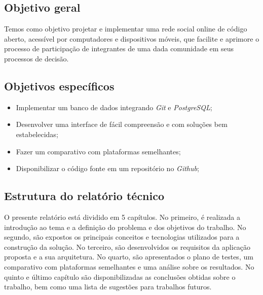 
\subsection{Objetivo geral}
Temos como objetivo projetar e implementar uma rede social online de código aberto, acessível por computadores e dispositivos móveis, que facilite e aprimore o processo de participação de integrantes de uma dada comunidade em seus processos de decisão.



\subsection{Objetivos específicos}
\begin{itemize} 
    \item Implementar um banco de dados integrando \textit{Git} e \textit{PostgreSQL};
    \item Desenvolver uma interface de fácil compreensão e com soluções bem estabelecidas;
    \item Fazer um comparativo com plataformas semelhantes;
    \item Disponibilizar o código fonte em um repositório no \textit{Github};
\end{itemize}

\subsection{Estrutura do relatório técnico}
O presente relatório está dividido em 5 capítulos. No primeiro, é realizada a introdução ao tema e a definição do problema e dos objetivos do trabalho. No segundo, são expostos os principais conceitos e tecnologias utilizados para a construção da solução. No terceiro, são desenvolvidos os requisitos da aplicação proposta e a sua arquitetura. No quarto, são apresentados o plano de testes, um comparativo com plataformas semelhantes e uma análise sobre os resultados. No quinto e último capítulo são disponibilizadas as conclusões obtidas sobre o trabalho, bem como uma lista de sugestões para trabalhos futuros.